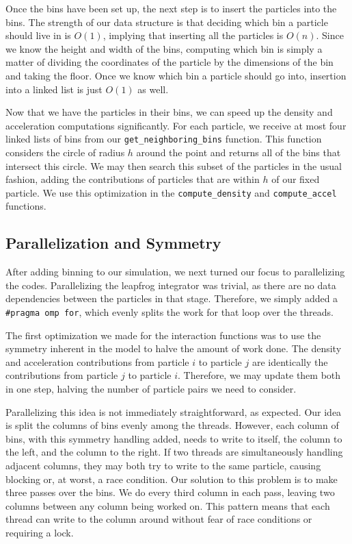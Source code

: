 \documentclass[12pt]{article}
\def\ind{\vspace{0.75em}\noindent}
\begin{document}
\ind Once the bins have been set up, the next step is to insert the particles
into the bins. The strength of our data structure is that deciding which
bin a particle should live in is $O(1)$, implying that inserting all
the particles is $O(n)$. Since we know the height and width of the
bins, computing which bin is simply a matter of dividing the coordinates
of the particle by the dimensions of the bin and taking the floor.
Once we know which bin a particle should go into, insertion into a
linked list is just $O(1)$ as well.

\ind Now that we have the particles in their bins, we can speed up the
density and acceleration computations significantly. For each particle,
we receive at most four linked lists of bins from our {\tt get\_neighboring\_bins}
function. This function considers the circle of radius $h$ around the
point and returns all of the bins that intersect this circle. We
may then search this subset of the particles in the usual fashion,
adding the contributions of particles that are within $h$ of our
fixed particle. We use this optimization in the {\tt compute\_density}
and {\tt compute\_accel} functions.

\subsection*{Parallelization and Symmetry}
After adding binning to our simulation, we next turned our focus to
parallelizing the codes. Parallelizing the leapfrog integrator was
trivial, as there are no data dependencies between the particles
in that stage. Therefore, we simply added a {\tt \#pragma omp for},
which evenly splits the work for that loop over the threads.

\ind The first optimization we made for the interaction functions
was to use the symmetry inherent in the model to halve the amount
of work done. The density and acceleration contributions from particle
$i$ to particle $j$ are identically the contributions from particle
$j$ to particle $i$. Therefore, we may update them both in
one step, halving the number of particle pairs we need to consider.

\ind Parallelizing this idea is not immediately straightforward,
as expected. Our idea is split the columns of bins evenly among
the threads. However, each column of bins, with this symmetry handling
added, needs to write to itself, the column to the left, and the column
to the right. If two threads are simultaneously handling adjacent
columns, they may both try to write to the same particle, causing
blocking or, at worst, a race condition. Our solution to this problem
is to make three passes over the bins. We do every third column in
each pass, leaving two columns between any column being worked on.
This pattern means that each thread can write to the column around without
fear of race conditions or requiring a lock.
\end{document}
